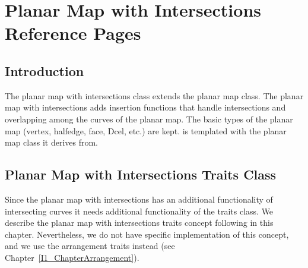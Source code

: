 


\clearpage
\section{Planar Map with Intersections Reference Pages}

\subsection*{Introduction}

The planar map with intersections class extends the planar map
class. The planar map with intersections adds insertion functions
that handle intersections and overlapping among the curves of the
planar map. The basic types of the planar map (vertex, halfedge,
face, Dcel, etc.) are kept. 
is templated with the planar map class it derives from.

\subsection*{Planar Map with Intersections Traits Class}
Since the planar map with intersections has an additional
functionality of intersecting curves it needs additional
functionality of the traits class. We describe the planar map with
intersections traits concept following in this chapter.
Nevertheless, we do not have specific implementation of this
concept, and we use the arrangement traits instead (see
Chapter~\ref{I1_ChapterArrangement}).


